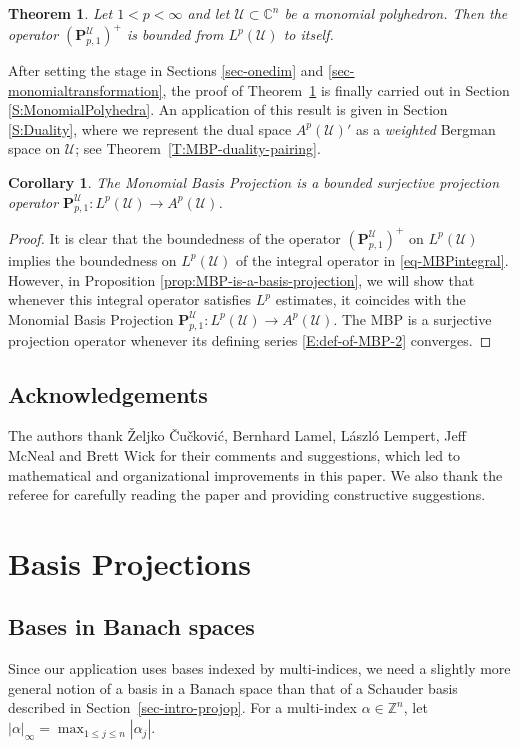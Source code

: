 \documentclass[letterpaper,11pt,reqno]{amsart}
\theoremstyle{plain}
\newtheorem{theorem}[equation]{Theorem}
\newtheorem{corollary}[equation]{Corollary}
\theoremstyle{definition}
\theoremstyle{remark}
\theoremstyle{remark}
\numberwithin{equation}{section}
\newcommand{\abs}[1]{\left\vert#1\right\vert}
\newcommand{\cx}{{\mathbb C}}
\newcommand{\Z}{{\mathbb Z}}
\newcommand{\Uu}{\mathscr{U}}
\begin{document}
\begin{theorem}\label{T:MBP-AbsBoundedness}
Let $1<p<\infty$ and let $\Uu\subset \cx^n$ be a monomial polyhedron. Then the operator $(\bm{P}^\Uu_{p,1})^+$ is bounded from $L^p(\Uu)$ to itself.
\end{theorem}
After setting the stage in Sections \ref{sec-onedim} and \ref{sec-monomialtransformation}, the proof of Theorem~\ref{T:MBP-AbsBoundedness} is finally carried out in Section \ref{S:MonomialPolyhedra}.
An application of this result is given in Section \ref{S:Duality}, where we represent the dual space $A^p(\Uu)'$ as a {\em weighted} Bergman space on $\Uu$; see Theorem~\ref{T:MBP-duality-pairing}.
\begin{corollary}\label{C:MBP-boundedness/surjectivity}
The Monomial Basis Projection is a bounded surjective projection operator $\bm{P}^\Uu_{p,1}: L^p(\Uu) \to A^p(\Uu)$.
\end{corollary}
\begin{proof}
It is clear that the boundedness of the operator $(\bm{P}^\Uu_{p,1})^+$ on $L^p(\Uu)$ implies the boundedness on $L^p(\Uu)$ of
the integral operator in \eqref{eq-MBPintegral}. However, in Proposition \ref{prop:MBP-is-a-basis-projection}, we will show that whenever this integral operator satisfies $L^p$ estimates, it coincides with the  Monomial Basis Projection $\bm{P}^\Uu_{p,1}: L^p(\Uu) \to A^p(\Uu)$. The MBP is a surjective projection operator 
whenever its defining series \eqref{E:def-of-MBP-2} converges.
\end{proof}

\subsection{Acknowledgements}
The authors thank Željko Čučković, Bernhard Lamel, László Lempert, Jeff McNeal and Brett Wick for their comments and suggestions, which led to mathematical and organizational improvements in this paper.
We also thank the referee for carefully reading the paper and providing constructive suggestions.


\section{Basis Projections}\label{sec-basisproj}
 
\subsection{Bases in Banach spaces}\label{sec-schauderdef}
Since our application uses bases indexed by multi-indices, we need a slightly more general notion of a  basis in a Banach space than that of a Schauder basis described in Section~\ref{sec-intro-projop}.
For a multi-index $\alpha\in \Z^n$, let $\abs{\alpha}_\infty= \max_{1\leq j \leq n} \abs{\alpha_j}$.
 
\end{document}
